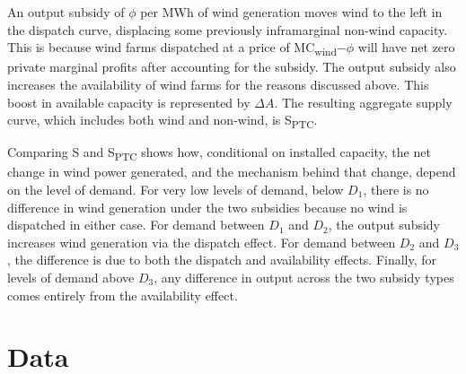 \documentclass[12pt]{article}
\begin{document}
An output subsidy of $\phi$ per MWh of wind generation moves wind to the left in the dispatch curve, displacing some previously inframarginal non-wind capacity. This is because wind farms dispatched at a price of MC\textsubscript{wind}$-\phi$ will have net zero private marginal profits after accounting for the subsidy. The output subsidy also increases the availability of wind farms for the reasons discussed above. This boost in available capacity is represented by $\Delta A$. The resulting aggregate supply curve, which includes both wind and non-wind, is S\textsubscript{PTC}.

Comparing S and S\textsubscript{PTC} shows how, conditional on installed capacity, the net change in wind power generated, and the mechanism behind that change, depend on the level of demand. For very low levels of demand, below $D_1$, there is no difference in wind generation under the two subsidies because no wind is dispatched in either case. For demand between $D_1$ and $D_2$, the output subsidy increases wind generation via the dispatch effect. For demand between $D_2$ and $D_3$, the difference is due to both the dispatch and availability effects. Finally, for levels of demand above $D_3$, any difference in output across the two subsidy types comes entirely from the availability effect.

\section{Data\label{sec:Data}}
\end{document}
